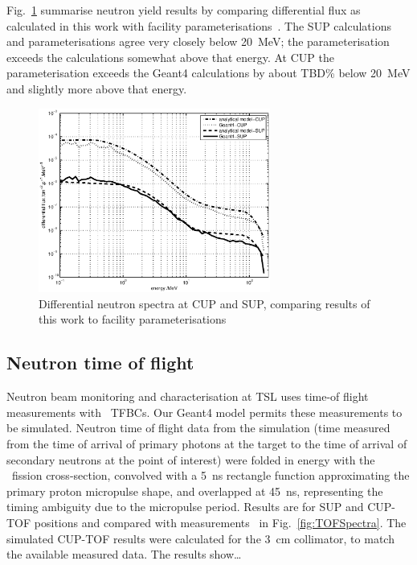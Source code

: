 \documentclass[11pt,a4paper]{IEEEtran}
\let\MYoriglatexcaption\caption
\renewcommand{\caption}[2][\relax]{\MYoriglatexcaption[#2]{#2}}
\def\U238{\BPChem{\^{238}U}}
\begin{document}
Fig.~\ref{fig:DifferentialSpectra} summarise neutron yield results by comparing differential flux as calculated in this work with facility parameterisations~\cite{Prokofiev2009,Prokofiev14}.
The SUP calculations and parameterisations agree very closely below \SI{20}{\MeV}; the parameterisation exceeds the calculations somewhat above that energy.
At CUP the parameterisation exceeds the Geant4 calculations by about TBD\% below \SI{20}{\MeV} and slightly more above that energy.

\begin{figure}[t]
    \centering
    \includegraphics[width=3in]{DiffYieldComparedSUPCUP10.eps}
    \caption{Differential neutron spectra at CUP and SUP, comparing results of this work to facility parameterisations~\cite{Prokofiev2009,Prokofiev14}}
    \label{fig:DifferentialSpectra}
\end{figure}

\subsection{Neutron time of flight}

Neutron beam monitoring and characterisation at TSL uses time-of flight measurements with \U238\ TFBCs.
Our Geant4 model permits these measurements to be simulated.
Neutron time of flight data from the simulation (time measured from the time of arrival of primary photons at the target to the time of arrival of secondary neutrons at the point of interest) were folded in energy with the \U238\ fission cross-section, convolved with a \SI{5}{\ns} rectangle function approximating the primary proton micropulse shape, and overlapped at \SI{45}{\ns}, representing the timing ambiguity due to the micropulse period.
Results are for SUP and CUP-TOF positions and compared with measurements~\cite{Prokofiev2009,Prokofiev14} in Fig.~\ref{fig:TOFSpectra}.
The simulated CUP-TOF results were calculated for the \SI{3}{\cm} collimator, to match the available measured data.
The results show\ldots{}
\end{document}
